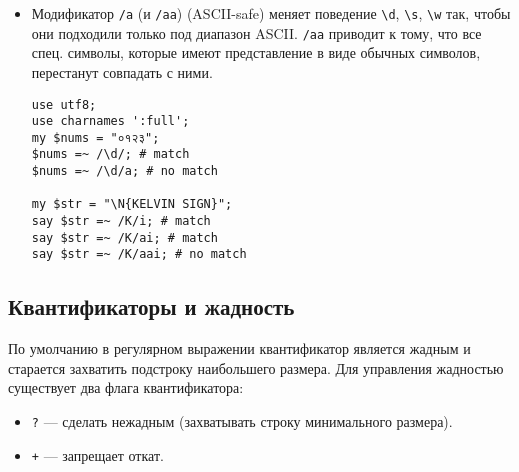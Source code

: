 \begin{itemize}
\begin{verbatim}
s//$_/see;
\end{verbatim}
После выполнения tr получается:
\begin{verbatim}
$?
    ?
        s/;s/s;;$?/
    :
        $_ = '=]=>%-{%#(/|}<&|`{'
    ;
tr( -/:-@[-`{-})
  (`-{/" -);
say $_; # system"echo -rf /"
s//$_/see;
# match empty string in $_
# replace it with eval(eval( '$_' ))
# eval '$_' gives 'system"echo -rf /"'
# eval 'system"echo -rf /"' gives ...
\end{verbatim}




\item Модификатор \verb|/a| (и \verb|/aa|) (ASCII-safe) меняет поведение \verb|\d|, \verb|\s|, \verb|\w| так, чтобы они подходили только под диапазон ASCII. \verb|/aa| приводит к тому, что все спец. символы, которые имеют представление в виде обычных символов, перестанут совпадать с ними.
\begin{verbatim}
use utf8;
use charnames ':full';
my $nums = "०१२३";
$nums =~ /\d/; # match
$nums =~ /\d/a; # no match

my $str = "\N{KELVIN SIGN}";
say $str =~ /K/i; # match
say $str =~ /K/ai; # match
say $str =~ /K/aai; # no match
\end{verbatim}

\end{itemize}

\subsection{Квантификаторы и жадность} %
По умолчанию в регулярном выражении квантификатор является жадным и старается захватить подстроку наибольшего размера. Для управления жадностью существует два флага квантификатора:
\begin{itemize}
  \item \verb|?| --- сделать нежадным (захватывать строку минимального размера).
  \item \verb|+| --- запрещает откат.
\end{itemize}

